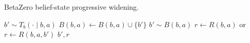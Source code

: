 \begin{algorithm}[H]
    \caption{BetaZero belief-state progressive widening.}
    \label{alg:betazero-state-pw}
    \begin{algorithmic}[1]
             
                \State $b' \sim T_b(\cdot \mid b, a)$ 
                \State $B(b,a) \leftarrow B(b,a) \cup \{b'\}$ 
            \Else
                \State $b' \sim B(b,a)$ 
            \EndIf
            \State $r \leftarrow R(b, a)$ or $r \leftarrow R(b, a, b')$
            \State \Return $b', r$
        \EndFunction
    \end{algorithmic}
\end{algorithm}